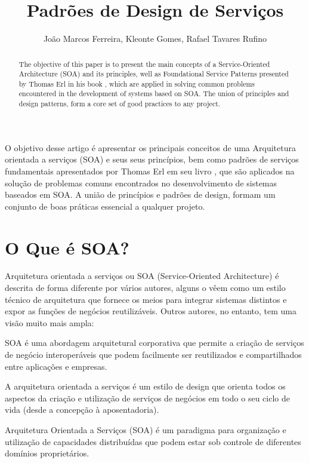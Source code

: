 \documentclass[12pt]{article}
\title{Padrões de Design de Serviços}
\author{João Marcos Ferreira\inst{1}, Kleonte Gomes\inst{2}, Rafael Tavares Rufino\inst{3} }
\begin{document}
 

\maketitle

\begin{abstract}
	The objective of this paper is to present the main concepts of a Service-Oriented Architecture (SOA) and its principles, well as Foundational Service Patterns presented by Thomas Erl in his book \cite{erl_padroes}, which are applied in solving common problems encountered in the development of systems based on SOA. The union of principles and design patterns, form a core set of good practices to any project.

\end{abstract}
   
\begin{resumo} 
	O objetivo desse artigo é apresentar os principais conceitos de uma Arquitetura orientada a serviços (SOA) e seus seus princípios, bem como padrões de serviços fundamentais apresentados por Thomas Erl em seu livro \cite{erl_padroes}, que são aplicados na solução de problemas comuns encontrados no desenvolvimento de sistemas baseados em SOA. A união de princípios e padrões de design, formam um conjunto de boas práticas essencial a qualquer projeto.   
\end{resumo}


\section{O Que é SOA?}

Arquitetura orientada a serviços ou SOA (Service-Oriented Architecture) é descrita de forma diferente por vários autores, alguns o vêem como um estilo técnico de arquitetura que fornece os meios para integrar sistemas distintos e expor as funções de negócios reutilizáveis. Outros autores, no entanto, tem uma visão muito mais ampla:

SOA é uma abordagem arquitetural corporativa que permite a criação de serviços de negócio interoperáveis que podem facilmente ser reutilizados e compartilhados entre aplicações e empresas.

A arquitetura orientada a serviços é um estilo de design que orienta todos os aspectos da criação e utilização de serviços de negócios em todo o seu ciclo de vida (desde a concepção à aposentadoria). \cite{newcomer}

Arquitetura Orientada a Serviços (SOA) é um paradigma para organização e utilização de capacidades distribuídas que podem estar sob controle de diferentes domínios proprietários. \cite{oasis}
\end{document}
